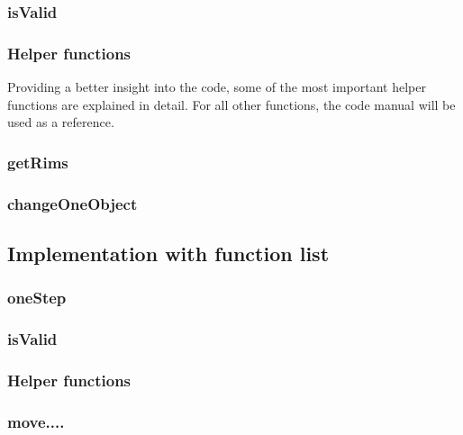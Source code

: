 \subsubsection{isValid}
\subsubsection{Helper functions}
Providing a better insight into the code, some of the most important helper functions are explained in detail. For all other functions, the code manual will be used as a reference.
\subsubsection{getRims}
\subsubsection{changeOneObject}

\subsection{Implementation with function list}
\subsubsection{oneStep}
\subsubsection{isValid}
\subsubsection{Helper functions}
\subsubsection{move....}
